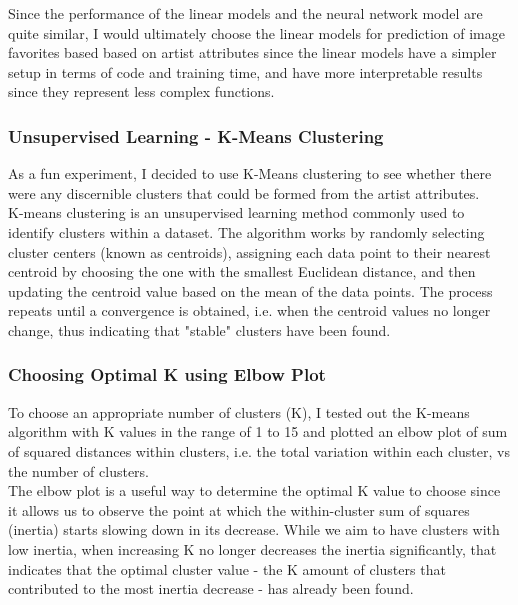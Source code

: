\documentclass[11pt]{article}
\begin{document}
Since the performance of the linear models and the neural network model
are quite similar, I would ultimately choose the linear models for
prediction of image favorites based based on artist attributes since the
linear models have a simpler setup in terms of code and training time,
and have more interpretable results since they represent less complex
functions.
\newpage
    \subsubsection{Unsupervised Learning - K-Means Clustering}

As a fun experiment, I decided to use K-Means clustering to see whether
there were any discernible clusters that could be formed from the artist
attributes.\\

K-means clustering is an unsupervised learning method commonly used to
identify clusters within a dataset. The algorithm works by randomly
selecting cluster centers (known as centroids), assigning each data
point to their nearest centroid by choosing the one with the smallest
Euclidean distance, and then updating the centroid value based on the
mean of the data points. The process repeats until a convergence is
obtained, i.e. when the centroid values no longer change, thus
indicating that "stable" clusters have been found.

\subsubsection*{Choosing Optimal K using Elbow Plot}

To choose an appropriate number of clusters (K), I tested out the
K-means algorithm with K values in the range of 1 to 15 and plotted an
elbow plot of sum of squared distances within clusters, i.e. the total
variation within each cluster, vs the number of clusters.\\

The elbow plot is a useful way to determine the optimal K value to
choose since it allows us to observe the point at which the
within-cluster sum of squares (inertia) starts slowing down in its
decrease. While we aim to have clusters with low inertia, when
increasing K no longer decreases the inertia significantly, that
indicates that the optimal cluster value - the K amount of clusters that
contributed to the most inertia decrease - has already been found.\\
\end{document}
